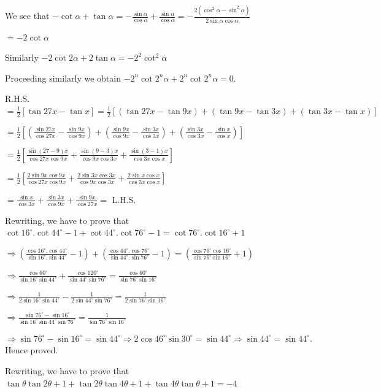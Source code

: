   We see that $-\cot\alpha + \tan\alpha = -\frac{\sin\alpha}{\cos\alpha} + \frac{\sin\alpha}{\cos\alpha}
  = -\frac{2(\cos^2\alpha - \sin^2\alpha)}{2\sin\alpha\cos\alpha}$

  $= -2\cot\alpha$

  Similarly $-2\cot2\alpha + 2\tan\alpha = -2^2\cot^2\alpha$

  Proceeding similarly we obtain $-2^n\cot2^n\alpha + 2^n\cot2^n\alpha = 0$.
\item R.H.S.\ $= \frac{1}{2}[\tan27x - \tan x] = \frac{1}{2}[(\tan27x - \tan9x) + (\tan9x - \tan3x) +
  (\tan3x - \tan x)]$

  $= \frac{1}{2}\left[\left(\frac{\sin27x}{\cos27x} - \frac{\sin9x}{\cos9x}\right)
  + \left(\frac{\sin9x}{\cos9x} - \frac{\sin3x}{\cos3x}\right) + \left(\frac{\sin3x}{\cos3x} - \frac{\sin
    x}{\cos x}\right)\right]$

  $= \frac{1}{2}\left[\frac{\sin(27 - 9)x}{\cos27x\cos9x} + \frac{\sin(9 - 3)x}{\cos9x\cos3x} + \frac{\sin(3
    - 1)x}{\cos3x\cos x}\right]$

  $= \frac{1}{2}\left[\frac{2\sin9x\cos9x}{\cos27x\cos9x} + \frac{2\sin3x\cos3x}{\cos9x\cos3x} + \frac{2\sin
    x\cos x}{\cos3x\cos x}\right]$

  $= \frac{\sin x}{\cos3x} + \frac{\sin3x}{\cos9x} + \frac{\sin9x}{\cos27x} =$ L.H.S.
\item Rewriting, we have to prove that $\cot16^\circ.\cot44^\circ - 1 + \cot44^\circ.\cot76^\circ - 1
  = \cot76^\circ.\cot16^\circ + 1$

  $\Rightarrow \left(\frac{\cos16^\circ.\cos44^\circ}{\sin16^\circ.\sin44^\circ} - 1\right)
  + \left(\frac{\cos44^\circ.\cos76^\circ}{\sin44^\circ.\sin76^\circ} - 1\right)
  = \left(\frac{\cos76^\circ\cos16^\circ}{\sin76^\circ\sin16^\circ} + 1\right)$

  $\Rightarrow \frac{\cos60^\circ}{\sin16^\circ\sin44^\circ}
  + \frac{\cos120^\circ}{\sin44^\circ\sin76^\circ} = \frac{\cos60^\circ}{\sin76^\circ\sin16^\circ}$

  $\Rightarrow \frac{1}{2\sin16^\circ\sin44^\circ} - \frac{1}{2\sin44^\circ\sin76^\circ}
  = \frac{1}{2\sin76^\circ\sin16^\circ}$

  $\Rightarrow \frac{\sin76^\circ - \sin16^\circ}{\sin16^\circ\sin44^\circ\sin76^\circ}
  = \frac{1}{\sin76^\circ\sin16^\circ}$

  $\Rightarrow \sin76^\circ - \sin16^\circ = \sin44^\circ \Rightarrow 2\cos46^\circ\sin30^\circ
  = \sin44^\circ \Rightarrow \sin44^\circ = \sin44^\circ$. Hence proved.
\item Rewriting, we have to prove that $\tan\theta\tan2\theta + 1 + \tan2\theta\tan4\theta + 1
  + \tan4\theta\tan\theta + 1 = -4$

